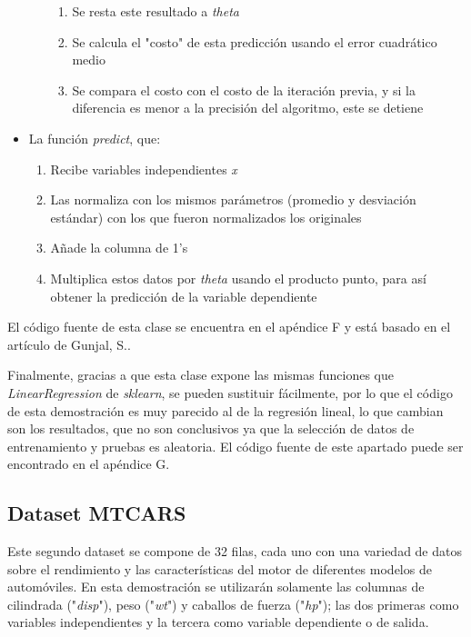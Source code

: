 \documentclass[sigconf,authorversion,nonacm]{acmart}
\begin{document}
\begin{itemize}
\begin{enumerate}
\begin{enumerate}
      \item Se resta este resultado a \textit{theta}
      \item Se calcula el "costo" de esta predicción usando el error cuadrático medio
      \item Se compara el costo con el costo de la iteración previa, y si la diferencia es menor a la precisión del algoritmo, este se detiene
    \end{enumerate}
  \end{enumerate}
  \item La función \textit{predict}, que:
  \begin{enumerate}
    \item Recibe variables independientes \textit{x}
    \item Las normaliza con los mismos parámetros (promedio y desviación estándar) con los que fueron normalizados los originales
    \item Añade la columna de 1's
    \item Multiplica estos datos por \textit{theta} usando el producto punto, para así obtener la predicción de la variable dependiente
  \end{enumerate}
\end{itemize}
El código fuente de esta clase se encuentra en el apéndice F y está basado en el artículo de Gunjal, S.\cite{gunjalGradient}.

Finalmente, gracias a que esta clase expone las mismas funciones que \textit{LinearRegression} de \textit{sklearn}, se pueden sustituir fácilmente, por lo que el código de esta demostración es muy parecido al de la regresión lineal, lo que cambian son los resultados, que no son conclusivos ya que la selección de datos de entrenamiento y pruebas es aleatoria. El código fuente de este apartado puede ser encontrado en el apéndice G.


\subsection{Dataset MTCARS}
Este segundo dataset se compone de 32 filas, cada uno con una variedad de datos sobre el rendimiento y las características del motor de diferentes modelos de automóviles. En esta demostración se utilizarán solamente las columnas de cilindrada ("\textit{disp}"), peso ("\textit{wt}") y caballos de fuerza ("\textit{hp}"); las dos primeras como variables independientes y la tercera como variable dependiente o de salida.
\end{document}
